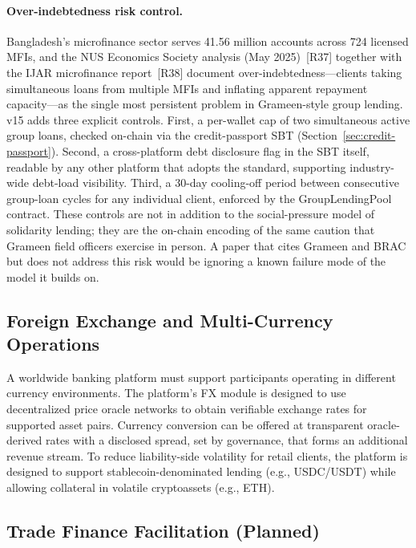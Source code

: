 \documentclass[12pt,a4paper]{report}
\begin{document}
\paragraph{Over-indebtedness risk control.}
\label{sec:over-indebt}
Bangladesh's microfinance sector serves 41.56 million accounts across 724 licensed MFIs, and the NUS Economics Society analysis (May 2025)~[R37] together with the IJAR microfinance report~[R38] document over-indebtedness---clients taking simultaneous loans from multiple MFIs and inflating apparent repayment capacity---as the single most persistent problem in Grameen-style group lending. v15 adds three explicit controls. First, a per-wallet cap of two simultaneous active group loans, checked on-chain via the credit-passport SBT (Section~\ref{sec:credit-passport}). Second, a cross-platform debt disclosure flag in the SBT itself, readable by any other platform that adopts the standard, supporting industry-wide debt-load visibility. Third, a 30-day cooling-off period between consecutive group-loan cycles for any individual client, enforced by the GroupLendingPool contract. These controls are not in addition to the social-pressure model of solidarity lending; they are the on-chain encoding of the same caution that Grameen field officers exercise in person. A paper that cites Grameen and BRAC but does not address this risk would be ignoring a known failure mode of the model it builds on.

\subsection{Foreign Exchange and Multi-Currency Operations}

A worldwide banking platform must support participants operating in different currency environments. The platform's FX module is designed to use decentralized price oracle networks to obtain verifiable exchange rates for supported asset pairs. Currency conversion can be offered at transparent oracle-derived rates with a disclosed spread, set by governance, that forms an additional revenue stream. To reduce liability-side volatility for retail clients, the platform is designed to support stablecoin-denominated lending (e.g., USDC/USDT) while allowing collateral in volatile cryptoassets (e.g., ETH).

\subsection{Trade Finance Facilitation (Planned)}
\end{document}
